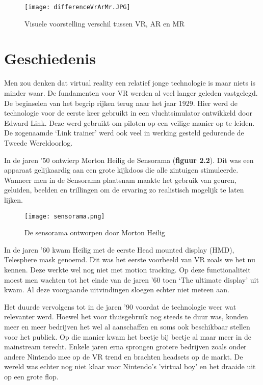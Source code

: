 \begin{figure}[h]
    \centering
    \texttt{[image: differenceVrArMr.JPG]}
    \caption{Visuele voorstelling verschil tussen VR, AR en MR \autocite{Barel2017}}
\end{figure}

\section{Geschiedenis}

Men zou denken dat virtual reality een relatief jonge technologie is maar niets is minder waar. De fundamenten voor VR werden al veel langer geleden vastgelegd. De beginselen van het begrip rijken terug naar het jaar 1929. Hier werd de technologie voor de eerste keer gebruikt in een vluchtsimulator ontwikkeld door Edward Link. Deze werd gebruikt om piloten op een veilige manier op te leiden. De zogenaamde ‘Link trainer’ werd ook veel in werking gesteld gedurende de Tweede Wereldoorlog.


In de jaren ’50 ontwierp Morton Heilig de Sensorama (\textbf{figuur 2.2}). Dit was een apparaat gelijkaardig aan een grote kijkdoos die alle zintuigen stimuleerde. Wanneer men in de Sensorama plaatsnam maakte het gebruik van geuren, geluiden, beelden en trillingen om de ervaring zo realistisch mogelijk te laten lijken. 

\begin{figure}[h]
    \centering
    \texttt{[image: sensorama.png]}
    \caption{De sensorama ontworpen door Morton Heilig \autocite{Society2019}}
\end{figure}

In de jaren ’60 kwam Heilig met de eerste Head mounted display (HMD), Telesphere mask genoemd. Dit was het eerste voorbeeld van VR zoals we het nu kennen. Deze werkte wel nog niet met motion tracking.
Op deze functionaliteit moest men wachten tot het einde van de jaren ’60 toen ‘The ultimate display’ uit kwam.
Al deze voorgaande uitvindingen sloegen echter niet meteen aan.

Het duurde vervolgens tot in de jaren ’90 voordat de technologie weer wat relevanter werd. Hoewel het voor thuisgebruik nog steeds te duur was, konden meer en meer bedrijven het wel al aanschaffen en soms ook beschikbaar stellen voor het publiek. Op die manier kwam het beetje bij beetje al maar meer in de mainstream terecht. Enkele jaren erna sprongen grotere bedrijven zoals onder andere Nintendo mee op de VR trend en brachten headsets op de markt. De wereld was echter nog niet klaar voor Nintendo's 'virtual boy' en het draaide uit op een grote flop.

